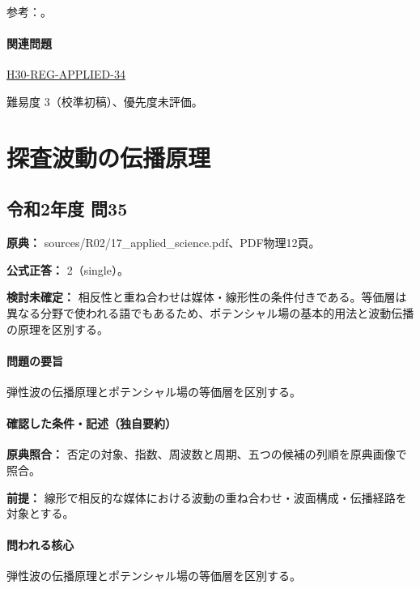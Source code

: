 \par 参考：\cite{mit_signals2010,mit_moving2012,scipy_notch,scipy_fft,usgs_processing2000,pygimli_inversion}。

\paragraph{関連問題} \hyperref[q:h30-reg-applied-34]{H30-REG-APPLIED-34}

\par 難易度 3（校準初稿）、優先度未評価。

\section{探査波動の伝播原理}

\subsection{令和2年度 問35}
\label{q:r02-reg-applied-35}

\noindent\textbf{原典：} sources/R02/17\_applied\_science.pdf、PDF物理12頁。

\textbf{公式正答：} 2（single）。

\par\textbf{検討未確定：} 相反性と重ね合わせは媒体・線形性の条件付きである。等価層は異なる分野で使われる語でもあるため、ポテンシャル場の基本的用法と波動伝播の原理を区別する。

\paragraph{問題の要旨} 弾性波の伝播原理とポテンシャル場の等価層を区別する。

\paragraph{確認した条件・記述（独自要約）}\mbox{}\par

\noindent\textbf{原典照合：} 否定の対象、指数、周波数と周期、五つの候補の列順を原典画像で照合。\par

\noindent\textbf{前提：} 線形で相反的な媒体における波動の重ね合わせ・波面構成・伝播経路を対象とする。\par

\paragraph{問われる核心} 弾性波の伝播原理とポテンシャル場の等価層を区別する。

